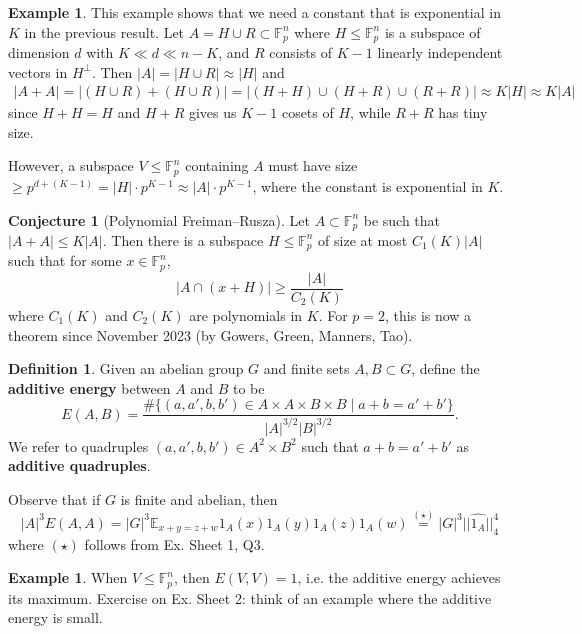 \documentclass{article}
\theoremstyle{definition}
\newtheorem{conj}[theorem]{Conjecture}
\newtheorem{example}[theorem]{Example}
\newtheorem{defn}[theorem]{Definition}
\begin{document}
\begin{example}
    This example shows that we need a constant that is exponential in $K$ in the previous result. Let $A = H \cup R \subset \mathbb{F}_p^n$ where $H \le \mathbb{F}_p^n$ is a subspace of dimension $d$ with $K \ll d \ll n-K$, and $R$ consists of $K-1$ linearly independent vectors in $H^\perp$. Then $\left|A\right| = \left|H \cup R\right| \approx \left|H\right|$ and 
    \begin{align*}
        \left|A+A\right| = \left|(H\cup R)+(H\cup R)\right| = \left|(H+H)\cup(H+R)\cup(R+R)\right| \approx K\left|H\right| \approx K\left|A\right|
    \end{align*}
    since $H+H=H$ and $H+R$ gives us $K-1$ cosets of $H$, while $R+R$ has tiny size.
    \vspace{1mm}
     
    However, a subspace $V \le \mathbb{F}_p^n$ containing $A$ must have size $\ge p^{d+(K-1)} = \left|H\right|\cdot p^{K-1} \approx \left|A\right|\cdot p^{K-1}$,
    where the constant is exponential in $K$.
\end{example}
\begin{conj}[Polynomial Freiman--Rusza]
    Let $A \subset \mathbb{F}_p^n$ be such that $\left|A+A\right|\le K\left|A\right|$. Then there is a subspace $H \le \mathbb{F}_p^n$ of size at most $C_1(K)\left|A\right|$ such that for some $x \in \mathbb{F}_p^n$, $$\left|A \cap (x+H)\right| \ge \frac{\left|A\right|}{C_2(K)}$$ where $C_1(K)$ and $C_2(K)$ are polynomials in $K$. For $p=2$, this is now a theorem since November 2023 (by Gowers, Green, Manners, Tao).
\end{conj}
\begin{defn}
    Given an abelian group $G$ and finite sets $A,B \subset G$, define the \textbf{additive energy} between $A$ and $B$ to be \[
    E(A,B) = \frac{\#\{(a,a',b,b') \in A \times A \times B \times B \mid a+b=a'+b'\}}{\left|A\right|^{3/2}\left|B\right|^{3/2}}.
    \]
    We refer to quadruples $(a,a',b,b') \in A^2 \times B^2$ such that $a+b=a'+b'$ as \textbf{additive quadruples}.
\end{defn}
Observe that if $G$ is finite and abelian, then $$\left|A\right|^3E(A,A) = \left|G\right|^3 \mathbb{E}_{x+y=z+w}1_A(x)1_A(y)1_A(z)1_A(w) \stackrel{(\star)}{=} \left|G\right|^3 ||\widehat{1_A}||_4^4$$
where $(\star)$ follows from Ex. Sheet 1, Q3.
\begin{example}
    When $V \le \mathbb{F}_p^n$, then $E(V,V)=1$, i.e. the additive energy achieves its maximum. Exercise on Ex. Sheet 2: think of an example where the additive energy is small.
\end{example}
\end{document}
